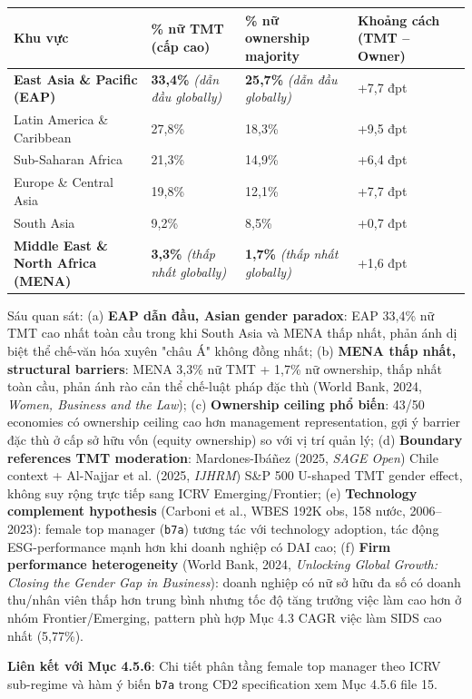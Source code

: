 \documentclass[12pt,a4paper]{article}
\begin{document}
\begin{longtable}[]{@{}llll@{}}
\toprule\noalign{}
Khu vực & \% nữ TMT (cấp cao) & \% nữ ownership majority & Khoảng cách
(TMT -- Owner) \\
\midrule\noalign{}
\endhead
\bottomrule\noalign{}
\endlastfoot
\textbf{East Asia \& Pacific (EAP)} & \textbf{33,4\%} \emph{(dẫn đầu
globally)} & \textbf{25,7\%} \emph{(dẫn đầu globally)} & +7,7 đpt \\
Latin America \& Caribbean & 27,8\% & 18,3\% & +9,5 đpt \\
Sub-Saharan Africa & 21,3\% & 14,9\% & +6,4 đpt \\
Europe \& Central Asia & 19,8\% & 12,1\% & +7,7 đpt \\
South Asia & 9,2\% & 8,5\% & +0,7 đpt \\
\textbf{Middle East \& North Africa (MENA)} & \textbf{3,3\%} \emph{(thấp
nhất globally)} & \textbf{1,7\%} \emph{(thấp nhất globally)} & +1,6
đpt \\
\end{longtable}

Sáu quan sát: (a) \textbf{EAP dẫn đầu, Asian gender paradox}: EAP 33,4\%
nữ TMT cao nhất toàn cầu trong khi South Asia và MENA thấp nhất, phản
ánh dị biệt thể chế-văn hóa xuyên "châu Á" không đồng nhất; (b)
\textbf{MENA thấp nhất, structural barriers}: MENA 3,3\% nữ TMT + 1,7\%
nữ ownership, thấp nhất toàn cầu, phản ánh rào cản thể chế-luật pháp đặc
thù (World Bank, 2024, \emph{Women, Business and the Law}); (c)
\textbf{Ownership ceiling phổ biến}: 43/50 economies có ownership
ceiling cao hơn management representation, gợi ý barrier đặc thù ở cấp
sở hữu vốn (equity ownership) so với vị trí quản lý; (d)
\textbf{Boundary references TMT moderation}: Mardones-Ibáñez (2025,
\emph{SAGE Open}) Chile context + Al-Najjar et al. (2025, \emph{IJHRM})
S\&P 500 U-shaped TMT gender effect, không suy rộng trực tiếp sang ICRV
Emerging/Frontier; (e) \textbf{Technology complement hypothesis}
(Carboni et al., WBES 192K obs, 158 nước, 2006--2023): female top
manager (\texttt{b7a}) tương tác với technology adoption, tác động
ESG-performance mạnh hơn khi doanh nghiệp có DAI cao; (f) \textbf{Firm
performance heterogeneity} (World Bank, 2024, \emph{Unlocking Global
Growth: Closing the Gender Gap in Business}): doanh nghiệp có nữ sở hữu
đa số có doanh thu/nhân viên thấp hơn trung bình nhưng tốc độ tăng
trưởng việc làm cao hơn ở nhóm Frontier/Emerging, pattern phù hợp Mục
4.3 CAGR việc làm SIDS cao nhất (5,77\%).

\textbf{Liên kết với Mục 4.5.6}: Chi tiết phân tầng female top manager
theo ICRV sub-regime và hàm ý biến \texttt{b7a} trong CĐ2 specification
xem Mục 4.5.6 file 15.
\end{document}
